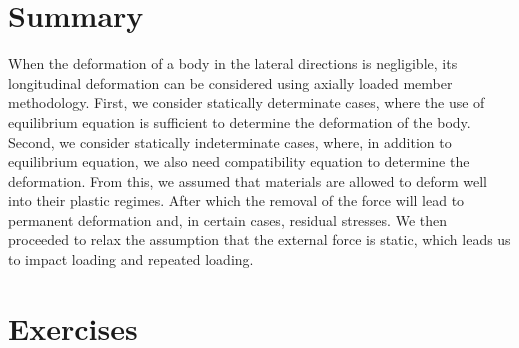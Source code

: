 \documentclass[
10pt,
a4paper,
openany,
svgnames,
]{book} %
\begin{document}
\section*{Summary}

When the deformation of a body in the lateral directions is negligible, its longitudinal deformation can be considered using axially loaded member methodology. First, we consider statically determinate cases, where the use of equilibrium equation is sufficient to determine the deformation of the body. Second, we consider statically indeterminate cases, where, in addition to equilibrium equation, we also need compatibility equation to determine the deformation. From this, we assumed that materials are allowed to deform well into their plastic regimes. After which the removal of the force will lead to permanent deformation and, in certain cases, residual stresses. We then proceeded to relax the assumption that the external force is static, which leads us to impact loading and repeated loading.

\section*{Exercises}
\end{document}
